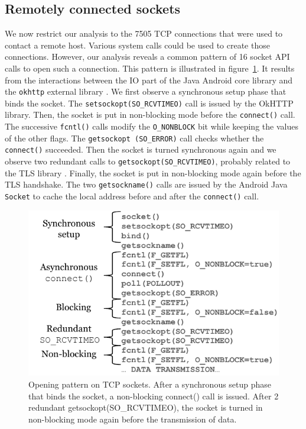 \subsection{Remotely connected sockets}

We now restrict our analysis to the 7505 TCP connections that
were used to contact a remote host. Various system calls could be used
to create those connections. However, our analysis reveals a common pattern of
16 socket API calls to open such a connection. This pattern is illustrated in
figure~\ref{fig:opening_pattern}. It results from the interactions
between the IO part of the Java Android core library \cite{aosp_socket}
and the \texttt{okhttp} external library \cite{aosp_okhttp_socketconnector}.
We first observe a synchronous setup phase that binds the socket.
The \texttt{set\-sock\-opt(SO\_RCV\-TIMEO)} call is issued by the
OkHTTP library. Then, the socket is put in non-blocking mode before
the \texttt{connect()} call. The successive \texttt{fcntl()} calls
modify the \texttt{O\_NONBLOCK} bit while keeping the values of the  other
flags. The \texttt{getsockopt (SO\_ERROR)} call checks whether the
\texttt{connect()} succeeded. Then the socket is turned synchronous again and
we observe two redundant calls to \texttt{getsockopt(SO\_RCVTIMEO)}, probably
related to the TLS library \cite{aosp_conscrypt}. Finally, the socket is put in
non-blocking mode again before the TLS handshake. The two \texttt{getsockname()}
calls are issued by the Android Java \texttt{Socket} to cache the local address
before and after the \texttt{connect()} call.

\begin{figure}
\centering
\includegraphics[width=\columnwidth]{figures/opening_pattern}
\caption{Opening pattern on TCP sockets. \textmd{After a synchronous setup
phase that binds the socket, a non-blocking connect() call is issued. After 2
redundant getsockopt(SO\_RCVTIMEO), the socket is turned in non-blocking mode
again before the transmission of data.}}
\label{fig:opening_pattern}
\end{figure}

